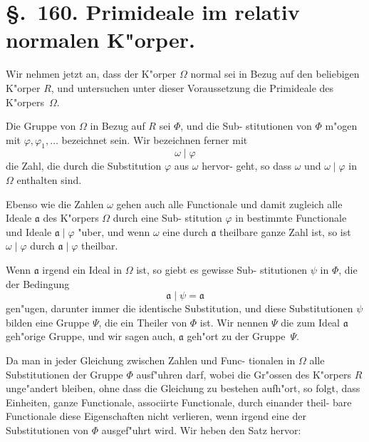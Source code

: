 \documentclass[12pt,a4paper]{article}
\theoremstyle{weber}
\begin{document}
\newpage
\section*{\S.~160. Primideale im relativ normalen K"orper.}

Wir nehmen jetzt an, dass der K"orper $\varOmega$ normal sei in
Bezug auf den beliebigen K"orper $R$, und untersuchen unter
dieser Voraussetzung die Primideale des K"orpers~$\varOmega$.

Die Gruppe von $\varOmega$ in Bezug auf $R$ sei $\varPhi$, und die Sub-
stitutionen von $\varPhi$ m"ogen mit $\varphi, \varphi_1, \dots$ bezeichnet sein. Wir
bezeichnen ferner mit
\begin{equation}\label{eq:s160-1}
\omega \mid \varphi
\end{equation}
die Zahl, die durch die Substitution $\varphi$ aus $\omega$ hervor-
geht, so dass $\omega$ und $\omega \mid \varphi$ in $\varOmega$ enthalten sind.

Ebenso wie die Zahlen $\omega$ gehen auch alle Functionale und
damit zugleich alle Ideale $\mathfrak{a}$ des K"orpers $\varOmega$ durch eine Sub-
stitution $\varphi$ in bestimmte Functionale und Ideale $\mathfrak{a} \mid \varphi$ "uber, und
wenn $\omega$ eine durch $\mathfrak{a}$ theilbare ganze Zahl ist, so ist $\omega \mid \varphi$ durch
$\mathfrak{a} \mid \varphi$ theilbar.

Wenn $\mathfrak{a}$ irgend ein Ideal in $\varOmega$ ist, so giebt es gewisse Sub-
stitutionen $\psi$ in $\varPhi$, die der Bedingung
\begin{equation}\label{eq:s160-2}
\mathfrak{a} \mid \psi = \mathfrak{a}
\end{equation}
gen"ugen, darunter immer die identische Substitution, und diese
Substitutionen $\psi$ bilden eine Gruppe $\varPsi$, die ein Theiler von $\varPhi$
ist. Wir nennen $\varPsi$ die zum Ideal $\mathfrak{a}$ geh"orige Gruppe, und
wir sagen auch, $\mathfrak{a}$ geh"ort zu der Gruppe~$\varPsi$.

Da man in jeder Gleichung zwischen Zahlen und Func-
tionalen in $\varOmega$ alle Substitutionen der Gruppe $\varPhi$ ausf"uhren darf,
wobei die Gr"ossen des K"orpers $R$ unge"andert bleiben, ohne dass
die Gleichung zu bestehen aufh"ort, so folgt, dass Einheiten,
ganze Functionale, associirte Functionale, durch einander theil-
bare Functionale diese Eigenschaften nicht verlieren, wenn irgend
eine der Substitutionen von $\varPhi$ ausgef"uhrt wird. Wir heben den
Satz hervor:
\end{document}
